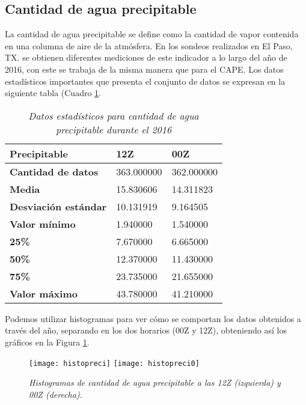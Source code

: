 \subsection{Cantidad de agua precipitable}
\noindent La cantidad de agua precipitable se define como la cantidad de vapor contenida en una columna de aire de la atmósfera\cite{pw}. En los sondeos realizados en El Paso, TX. se obtienen diferentes mediciones de este indicador a lo largo del año de 2016, con este se trabaja de la misma manera que para el CAPE. Los datos estadísticos importantes que presenta el conjunto de datos se expresan en la siguiente tabla (Cuadro \ref{precitabla}.

\begin{table}[ht!]
\centering
\caption{\textit{Datos estadísticos para cantidad de agua precipitable durante el 2016}}
\label{precitabla}
\begin{tabular}{|l|l|l|}
\hline
\textbf{Precipitable}        & \textbf{12Z} & \textbf{00Z} \\ \hline
\textbf{Cantidad de datos}   & 363.000000   & 362.000000   \\ \hline
\textbf{Media}               & 15.830606    & 14.311823    \\ \hline
\textbf{Desviación estándar} & 10.131919    & 9.164505     \\ \hline
\textbf{Valor mínimo}        & 1.940000     & 1.540000     \\ \hline
\textbf{25\%}                 & 7.670000     & 6.665000     \\ \hline
\textbf{50\%}                 & 12.370000    & 11.430000    \\ \hline
\textbf{75\%}                 & 23.735000    & 21.655000    \\ \hline
\textbf{Valor máximo}        & 43.780000    & 41.210000    \\ \hline
\end{tabular}
\end{table}

Podemos utilizar histogramas para ver cómo se comportan los datos obtenidos a través del año, separando en los dos horarios (00Z y 12Z), obteniendo así los gráficos en la Figura \ref{hpreci}.

\begin{figure}[ht!]
\centering
\texttt{[image: histopreci]} \texttt{[image: histopreci0]}
\caption{\textit{Histogramas de cantidad de agua precipitable a las 12Z (izquierda) y 00Z (derecha).}}
\label{hpreci}
\end{figure}

